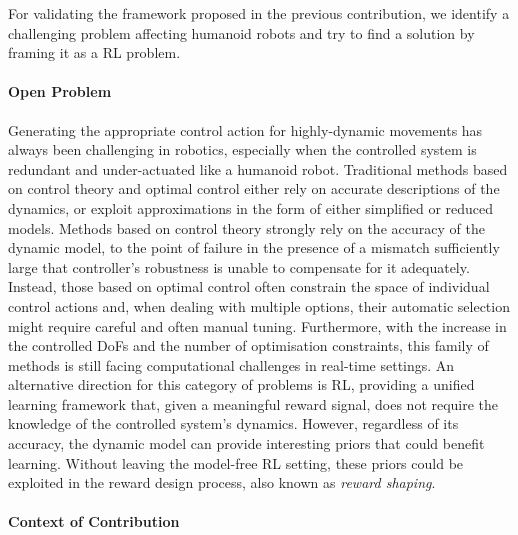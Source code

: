 For validating the framework proposed in the previous contribution, we identify a challenging problem affecting humanoid robots and try to find a solution by framing it as a \ac{RL} problem.

\paragraph{Open Problem}

Generating the appropriate control action for highly-dynamic movements has always been challenging in robotics, especially when the controlled system is redundant and under-actuated like a humanoid robot.
Traditional methods based on control theory and optimal control either rely on accurate descriptions of the dynamics, or exploit approximations in the form of either simplified or reduced models.
Methods based on control theory strongly rely on the accuracy of the dynamic model, to the point of failure in the presence of a mismatch sufficiently large that controller's robustness is unable to compensate for it adequately.
Instead, those based on optimal control often constrain the space of individual control actions and, when dealing with multiple options, their automatic selection might require careful and often manual tuning.
Furthermore, with the increase in the controlled \acp{DoF} and the number of optimisation constraints, this family of methods is still facing computational challenges in real-time settings.
An alternative direction for this category of problems is \ac{RL}, providing a unified learning framework that, given a meaningful reward signal, does not require the knowledge of the controlled system's dynamics.
However, regardless of its accuracy, the dynamic model can provide interesting priors that could benefit learning.
Without leaving the model-free \ac{RL} setting, these priors could be exploited in the reward design process, also known as \emph{reward shaping}.

\paragraph{Context of Contribution}

